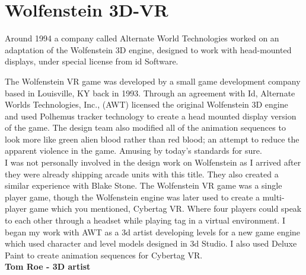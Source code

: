 \section{Wolfenstein 3D-VR}
Around 1994 a company called Alternate World Technologies worked on an adaptation of the Wolfenstein 3D engine, designed to work with head-mounted displays, under special license from id Software.\\
 \par
\begin{fancyquotes}
The Wolfenstein VR game was developed by a small game development company based in Louisville, KY back in 1993. Through an agreement with Id, Alternate Worlds Technologies, Inc., (AWT) licensed the original Wolfenstein 3D engine and used Polhemus tracker technology to create a head mounted display version of the game. The design team also modified all of the animation sequences to look more like green alien blood rather than red blood; an attempt to reduce the apparent violence in the game. Amusing by today's standards for sure.
 \bigskip \\
I was not personally involved in the design work on Wolfenstein as I arrived after they were already shipping arcade units with this title. They also created a similar experience with Blake Stone. The Wolfenstein VR game was a single player game, though the Wolfenstein engine was later used to create a multi-player game which you mentioned, Cybertag VR. Where four players could speak to each other through a headset while playing tag in a virtual environment. I began my work with AWT as a 3d artist developing levels for a new game engine which used character and level models designed in 3d Studio. I also used Deluxe Paint to create animation sequences for Cybertag VR.
 \bigskip \\
\textbf{Tom Roe - 3D artist}\\
 \end{fancyquotes}
\par





